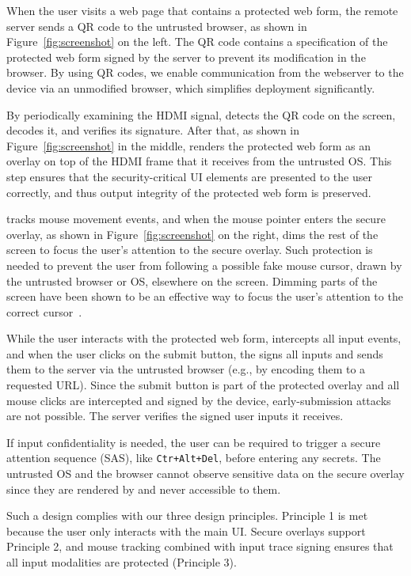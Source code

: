 When the user visits a web page that contains a protected web form, the remote server sends a QR code to the untrusted browser, as shown in Figure~\ref{fig:screenshot} on the left. The QR code contains a specification of the protected web form signed by the server to prevent its modification in the browser. By using QR codes, we enable communication from the webserver to the \hub device via an unmodified browser, which simplifies deployment significantly.

By periodically examining the HDMI signal, \hub detects the QR code on the screen, decodes it, and verifies its signature. After that, as shown in Figure~\ref{fig:screenshot} in the middle, \hub renders the protected web form as an overlay on top of the HDMI frame that it receives from the untrusted OS. This step ensures that the security-critical UI elements are presented to the user correctly, and thus output integrity of the protected web form is preserved.

\hub tracks mouse movement events, and when the mouse pointer enters the secure overlay, as shown in Figure~\ref{fig:screenshot} on the right, \hub dims the rest of the screen to focus the user's attention to the secure overlay. Such protection is needed to prevent the user from following a possible fake mouse cursor, drawn by the untrusted browser or OS, elsewhere on the screen. Dimming parts of the screen have been shown to be an effective way to focus the user's attention to the correct cursor~\cite{huang2012clickjacking}.

While the user interacts with the protected web form, \hub intercepts all input events, and when the user clicks on the submit button, the \hub signs all inputs and sends them to the server via the untrusted browser (e.g., by encoding them to a requested URL). Since the submit button is part of the protected overlay and all mouse clicks are intercepted and signed by the \hub device, early-submission attacks are not possible. The server verifies the signed user inputs it receives. 

If input confidentiality is needed, the user can be required to trigger a secure attention sequence (SAS), like \texttt{Ctr+Alt+Del}, before entering any secrets. The untrusted OS and the browser cannot observe sensitive data on the secure overlay since they are rendered by \hub and never accessible to them.

Such a design complies with our three design principles. Principle 1 is met because the user only interacts with the main UI. Secure overlays support Principle 2, and mouse tracking combined with input trace signing ensures that all input modalities are protected (Principle 3).

